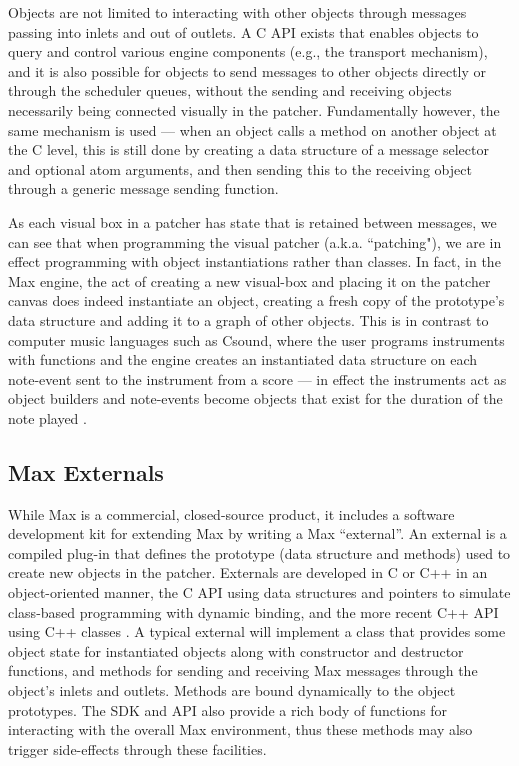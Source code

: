 \documentclass[acmsmall]{acmart}
\begin{document}
Objects are not limited to interacting with other objects through messages passing into inlets and out of 
outlets. A C API exists that enables objects to query and control various engine components (e.g., 
the transport mechanism), and it is also possible for objects to send messages to other objects 
directly or through the scheduler queues, without the sending and receiving objects 
necessarily being connected visually in the patcher. Fundamentally however, the same mechanism
is used --- when an object calls a method on another object at the C level, this is still done
by creating a data structure of a message selector and optional atom arguments, 
and then sending this to the receiving object through a generic message sending function.

As each visual box in a patcher has state that is retained between messages, we can see that when
programming the visual patcher (a.k.a. ``patching"), we are in effect programming with
object instantiations rather than classes. In fact, in the Max engine, the act of creating
a new visual-box and placing it on the patcher canvas does indeed instantiate an object, creating
a fresh copy of the prototype's data structure and adding it to a graph of other objects.
This is in contrast to computer music languages such as Csound, where the user programs instruments 
with functions and the engine creates an instantiated data structure on each note-event sent to 
the instrument from a score --- in effect the instruments act as object builders and note-events 
become objects that exist for the duration of the note played \cite{Lazzarini2013}.

\subsection{Max Externals}

While Max is a commercial, closed-source product, it includes a software development kit for 
extending Max by writing a Max “external”. An external is a compiled plug-in that defines the  
prototype (data structure and methods) used to create new objects in the patcher.  
Externals are developed in C or C++ in an object-oriented manner, the C API using data 
structures and pointers to simulate class-based programming with dynamic binding,
and the more recent C++ API using C++ classes \cite{Zicarelli2002}.
A typical external will implement a class that provides some object state for instantiated
objects along with constructor and destructor functions, and  
methods for sending and receiving Max messages through the object’s inlets and outlets.
Methods are bound dynamically to the object prototypes.
The SDK and API also provide a rich body of functions for interacting with the overall Max
environment, thus these methods may also trigger side-effects through these facilities.
\end{document}
